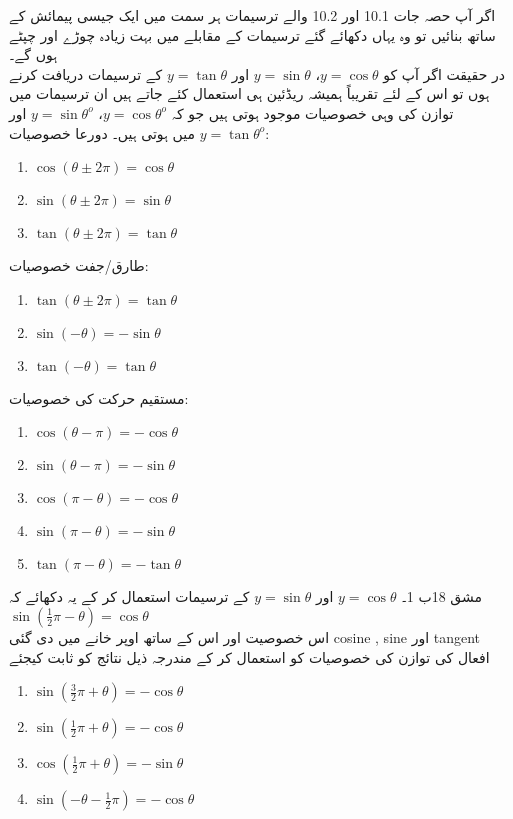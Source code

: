 اگر آپ حصہ جات 10.1 اور 10.2 والے ترسیمات ہر سمت میں ایک جیسی پیمائش کے ساتھ بنائیں تو وہ یہاں دکھائے گئے ترسیمات کے مقابلے میں بہت زیادہ چوڑے اور چپٹے ہوں گے۔\\ 
در حقیقت اگر آپ کو 
\(y=\cos\theta\)،
\(y=\sin\theta\)
اور
\(y=\tan\theta\) 
کے ترسیمات دریافت کرنے ہوں تو اس کے لئے تقریباً ہمیشہ ریڈئین ہی استعمال کئے جاتے ہیں
ان ترسیمات میں توازن کی وہی خصوصیات موجود ہوتی ہیں جو کہ
\(y=\cos\theta^o\)،
\(y=\sin\theta^o\)
اور
\(y=\tan\theta^o\)
میں ہوتی ہیں۔
دورعا خصوصیات: 
\begin{enumerate}
\item
\(\cos(\theta\pm2\pi)=\cos\theta\)
\item
\(\sin(\theta\pm2\pi)=\sin\theta\)
\item
\(\tan(\theta\pm2\pi)=\tan\theta\)\\
\end{enumerate}
طارق/جفت خصوصیات: 
\begin{enumerate}
\item
\(\tan(\theta\pm2\pi)=\tan\theta\)
\item
\(\sin(-\theta)=-\sin\theta\)
\item
\(\tan(-\theta)=\tan\theta\)\\
\end{enumerate}
مستقیم حرکت کی خصوصیات:
\begin{enumerate}
\item
\(\cos(\theta-\pi)=-\cos\theta\)
\item
\(\sin(\theta-\pi)=-\sin\theta\)
\item
\(\cos(\pi-\theta)=-\cos\theta\)
\item
\(\sin(\pi-\theta)=-\sin\theta\)
\item
\(\tan(\pi-\theta)=-\tan\theta\)\\
\end{enumerate}
مشق 18ب 
1۔ 
\(y=\cos\theta\)
اور
\(y=\sin\theta\)
کے ترسیمات استعمال کر کے یہ دکھائے کہ 
\(\sin(\frac{1}{2}\pi-\theta)=\cos\theta\)\\
اس خصوصیت اور اس کے ساتھ اوپر خانے میں دی گئی cosine , sine اور tangent افعال کی توازن کی خصوصیات کو استعمال کر کے مندرجہ ذیل نتائج کو ثابت کیجئے
\begin{multicols}{2}
\begin{enumerate}[a]
\item\(\sin(\frac{3}{2}\pi+\theta)=-\cos\theta\)
\item\(\sin(\frac{1}{2}\pi+\theta)=-\cos\theta\)
\item\(\cos(\frac{1}{2}\pi+\theta)=-\sin\theta\)
\item\(\sin(-\theta-\frac{1}{2}\pi)=-\cos\theta\)
\end{enumerate}
\end{multicols}
